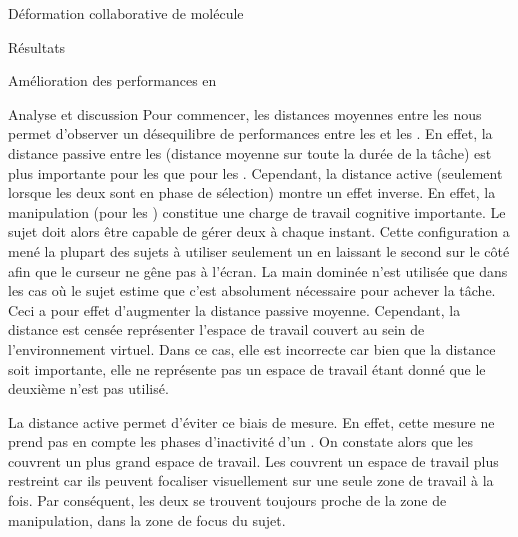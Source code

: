 \documentclass[myfrancais,ngerman,english,frenchb]{mythesis}
\begin{document}
\begin{mychapter}{Déformation collaborative de molécule}
\begin{mysection}{Résultats}
\begin{mysubsection}{Amélioration des performances en }
\begin{mysubsubsection}{Analyse et discussion}
					Pour commencer, les distances moyennes entre les  nous permet d'observer un désequilibre de performances entre les  et les  .
					En effet, la distance passive entre les  (distance moyenne sur toute la durée de la tâche) est plus importante pour les  que pour les .
					Cependant, la distance active (seulement lorsque les deux  sont en phase de sélection) montre un effet inverse.
					En effet, la manipulation  (pour les ) constitue une charge de travail cognitive importante.
					Le sujet doit alors être capable de gérer deux  à chaque instant.
					Cette configuration a mené la plupart des sujets à utiliser seulement un  en laissant le second sur le côté afin que le curseur ne gêne pas à l'écran.
					La main dominée n'est utilisée que dans les cas où le sujet estime que c'est absolument nécessaire pour achever la tâche.
					Ceci a pour effet d'augmenter la distance passive moyenne.
					Cependant, la distance est censée représenter l'espace de travail couvert au sein de l'environnement virtuel.
					Dans ce cas, elle est incorrecte car bien que la distance soit importante, elle ne représente pas un espace de travail étant donné que le deuxième  n'est pas utilisé.

					La distance active permet d'éviter ce biais de mesure.
					En effet, cette mesure ne prend pas en compte les phases d'inactivité d'un .
					On constate alors que les  couvrent un plus grand espace de travail.
					Les  couvrent un espace de travail plus restreint car ils peuvent focaliser visuellement sur une seule zone de travail à la fois.
					Par conséquent, les deux  se trouvent toujours proche de la zone de manipulation, dans la zone de focus du sujet.


\end{mysubsubsection}
\end{mysubsection}
\end{mysection}
\end{mychapter}
\end{document}
